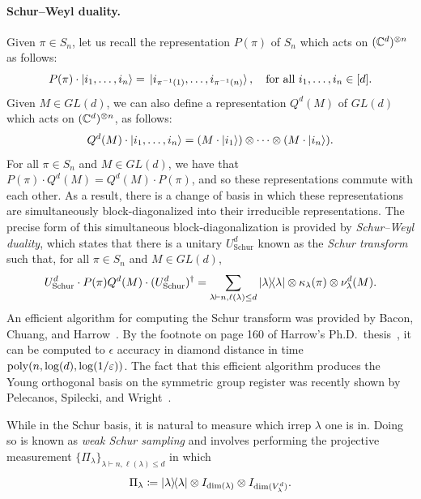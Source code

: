 \documentclass{article}
\newcommand{\schur}{U_{\mathrm{Schur}}}
\begin{document}
\paragraph{Schur--Weyl duality.}
Given $\pi \in S_n$, let us recall the representation $P(\pi)$ of $S_n$ which acts on $(\mathbb C^d)^{\otimes n}$ as follows:
\begin{equation*}
    P(\pi) \cdot \ket{i_1, \ldots, i_n}
    = \ket*{i_{\pi^{-1}(1)}, \ldots, i_{\pi^{-1}(n)}},
    \quad \text{for all $i_1, \ldots, i_n \in [d]$}.
\end{equation*}
Given $M \in GL(d)$, we can also define a representation $Q^d(M)$ of $GL(d)$ which acts on $(\mathbb C^d)^{\otimes n}$, as follows:
\begin{equation*}
    Q^d(M) \cdot \ket{i_1, \ldots, i_n}
    = (M \cdot \ket{i_1}) \otimes \cdots \otimes (M \cdot \ket{i_n}).
\end{equation*}
For all $\pi \in S_n$ and $M \in GL(d)$,
we have that $P(\pi) \cdot Q^d(M) = Q^d(M)\cdot P(\pi)$,
and so these representations commute with each other.
As a result, there is a change of basis in which these representations are simultaneously block-diagonalized into their irreducible representations.
The precise form of this simultaneous block-diagonalization is provided by \emph{Schur--Weyl duality}, which states that there is a unitary $\schur^d$ known as the \emph{Schur transform} such that, for all $\pi \in S_n$ and $M \in GL(d)$,
\begin{equation*}
    \schur^d \cdot P(\pi) Q^d(M) \cdot (\schur^d)^{\dagger}
    = \sum_{\lambda \vdash n, \ell(\lambda) \leq d} \ketbra{\lambda} \otimes \kappa_{\lambda}(\pi) \otimes \nu^d_{\lambda}(M).
\end{equation*}
An efficient algorithm for computing the Schur transform was provided by Bacon, Chuang, and Harrow~\cite{BCH05}.
By the footnote on page 160 of Harrow's Ph.D.\ thesis~\cite{Har05}, it can be computed to $\epsilon$ accuracy in diamond distance in time $\operatorname{poly}(n, \log(d), \log(1/\varepsilon))$.
The fact that this efficient algorithm produces the Young orthogonal basis on the symmetric group register was recently shown by Pelecanos, Spilecki, and Wright~\cite[Appendix A]{PSW25}.

While in the Schur basis,
it is natural to measure which irrep $\lambda$ one is in.
Doing so is known as \emph{weak Schur sampling}
and involves performing the projective measurement $\{\Pi_{\lambda}\}_{\lambda \vdash n, \ell(\lambda) \leq d}$ in which
\begin{equation*}
\Pi_{\lambda} \coloneqq \ketbra{\lambda} \otimes I_{\dim(\lambda)} \otimes I_{\dim(V_{\lambda}^d)}.
\end{equation*}
\end{document}
